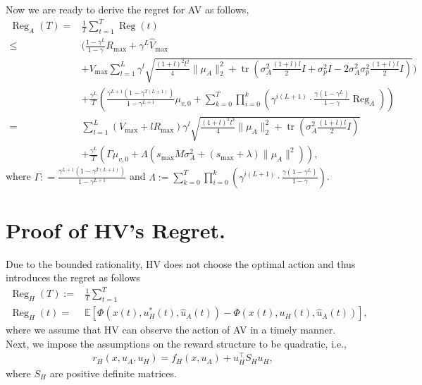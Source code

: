 Now we are ready to derive the regret for AV as follows,
\begin{align*}
    \operatorname{Reg}_A(T) =& \frac{1}{T}\sum_{t=1}^T \operatorname{Reg}(t)\\
    \leq & \Biggl(\frac{1-\gamma^L}{1-\gamma}R_{\max}+\gamma^L \hat{V}_{\max} \\
    & +V_{\max} \sum_{l=1}^L \gamma^l \sqrt{\frac{(1+l)^2l^2}{4}\|\mu_A\|^2_2 + \operatorname{tr}\left( \sigma_A^2 \frac{(1+l)l}{2}I + \sigma_p^2 I -2\sigma_A^2\sigma_p^2 \frac{(1+l)l}{2} I \right)}\Biggl) \\
    &+\frac{\gamma^L}{T} \left( \frac{\gamma^{L+1}(1-\gamma^{T(L+1)})}{1-\gamma^{L+1}}\mu_{v,0} + \sum_{k=0}^T \prod_{i=0}^k \left(\gamma^{i(L+1)} \cdot \frac{\gamma(1-\gamma^L)}{1-\gamma} \operatorname{Reg}_A \right)  \right)\\
    =&  \sum\nolimits_{l=1}^L (V_{\max} + lR_{\max})\gamma^l \sqrt{\frac{(1+l)^2l^2}{4}\|\mu_A\|^2_2 + \operatorname{tr}\left( \sigma_A^2 \frac{(1+l)l}{2}I \right)} \\
    &+ \frac{\gamma^L}{T}  \left( \Gamma \mu_{v,0} + \Lambda (s_{\max}M\sigma_A^2 + (s_{\max} + \lambda)\|\mu_A\|^2) \right),
\end{align*}
 where   $\Gamma : =  \frac{\gamma^{L+1}(1-\gamma^{T(L+1)})}{1-\gamma^{L+1}}$ and $\Lambda:=\sum_{k=0}^T \prod_{i=0}^k \left(\gamma^{i(L+1)} \cdot \frac{\gamma(1-\gamma^L)}{1-\gamma}\right)$.


\section{Proof of HV's Regret.} \label{app:hv}
Due to the bounded rationality, HV does not choose the optimal action and thus introduces the regret as follows
\begin{align*}
  \operatorname{Reg}_H(T) := & \frac{1}{T} \sum_{t=1}^T \\
    \operatorname{Reg}_H(t) =& \mathbb{E} \left[ \Phi(x(t),u_H^{*}(t),\hat{u}_A(t))-\Phi(x(t),u_H(t),\hat{u}_A(t))\right],
\end{align*}
where we assume that HV can observe the action of AV in a timely manner. Next, we impose the assumptions on the reward structure to be quadratic, i.e.,
\begin{align}
    r_H(x,u_A,u_H) = f_H(x,u_A) + u_H^{\top}S_Hu_H,
\end{align}
where $S_H$ are positive definite matrices. 


